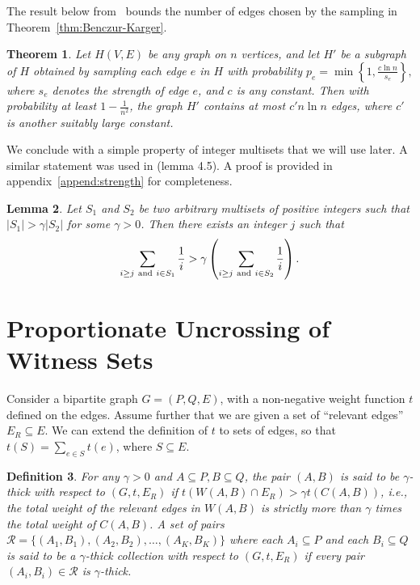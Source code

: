 \documentclass[11pt]{article}
\newtheorem{theorem}{Theorem}[section]
\newtheorem{lemma}[theorem]{Lemma}
\newtheorem{definition}[theorem]{Definition}
\newcommand{\coll}{{\mathcal R}}
\begin{document}
The result below from~\cite{benczurkarger96} bounds the number of edges chosen
by the sampling in Theorem~\ref{thm:Benczur-Karger}.
\begin{theorem}
\label{thm:Benczur-Karger2}
Let $H(V,E)$ be any graph on $n$ vertices, and let $H'$ be a subgraph of $H$ obtained by
sampling each edge $e$ in $H$ with probability
$ p_e = \min\left\{ 1, \frac{c \ln n}{s_e} \right\},$
where $s_e$ denotes the strength of edge $e$, and $c$ is any constant. Then
with probability at least $1 - \frac{1}{n^2}$, the graph $H'$ contains at most
$c' n \ln n$ edges, where $c'$ is another suitably large constant.
\end{theorem}

We conclude with a simple property of integer multisets that we will use
later. A similar statement was used in \cite{karger-levine} (lemma 4.5). A proof is provided in appendix~\ref{append:strength} for completeness.
\begin{lemma}
\label{lem:strength}
Let $S_1$ and $S_2$ be two arbitrary multisets of positive integers such that $|S_1| > \gamma |S_2|$ for some $\gamma > 0$.
Then there exists an integer $j$ such that
$$ \sum_{i \ge j~ {\rm and}~ i \in S_1} {\frac{1}{i}} > \gamma \left( \sum_{i \ge j~ {\rm and}~ i \in S_2} {\frac{1}{i}} \right).$$
\end{lemma}

\section{Proportionate Uncrossing of Witness Sets}
\label{sec:proportion}
Consider a bipartite graph $G=(P,Q,E)$, with a non-negative weight function
$t$ defined on the edges. Assume further that we are given a set of ``relevant
edges'' $E_R \subseteq E$. We can extend the definition of $t$ to sets of
edges, so that $t(S) = \sum_{e\in S}t(e)$, where $S\subseteq E$.

\begin{definition}
\label{def:gamma_thick}
For any $\gamma >
0$ and $A\subseteq P, B\subseteq Q$, the pair $(A,B)$ is said to be
$\gamma$-thick with respect to $(G,t,E_R)$ if $t(W(A,B)\cap E_R) > \gamma
t(C(A,B))$, {\em i.e.}, the total weight of the relevant edges in $W(A,B)$ is {\em
  strictly} more than $\gamma$ times the total weight of $C(A,B)$. A set of
pairs $\coll = \{(A_1, B_1), (A_2, B_2), \ldots, (A_K,B_K)\}$ where each $A_i
\subseteq P$ and each $B_i \subseteq Q$ is said to be a $\gamma$-thick
collection with respect to $(G,t,E_R)$ if every pair $(A_i,B_i) \in \coll$ is
$\gamma$-thick.
\end{definition}
\end{document}
